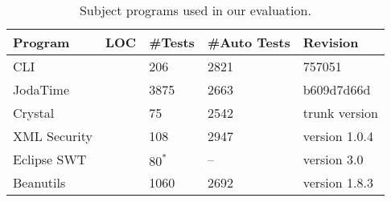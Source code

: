 
\begin{table}
\centering
\setlength{\tabcolsep}{0.5\tabcolsep}
\begin{tabular}{|l|l|l|l|l|}
\hline
\textbf{Program} & \textbf{LOC} & \textbf{\#Tests} & \textbf{\#Auto Tests} & \textbf{Revision}
\\
\hline
CLI &  & 206 
& 2821&  757051\\
JodaTime & & 3875 
& 2663 &  b609d7d66d\\
Crystal & & 75 & 2542 & trunk version\\
XML Security & & 108 & 2947 & version 1.0.4 \\ %
Eclipse SWT & & $80^*$ 
& -- 
& version 3.0 \\
Beanutils & & 1060 & 2692 & version 1.8.3 \\
\hline
\end{tabular}
\caption{Subject programs used in our evaluation. 
}
\label{tab:subjects}
\end{table}
